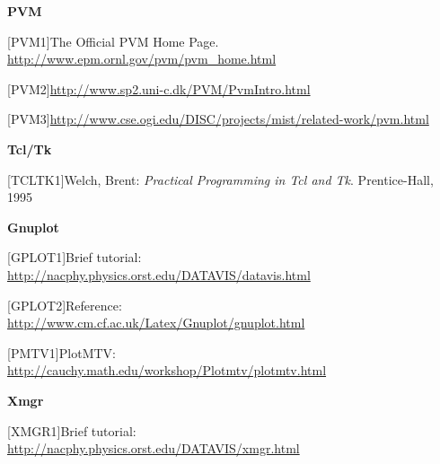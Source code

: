 \textbf{PVM}

[PVM1]\tab The Official PVM Home Page. \href{http://www.epm.ornl.gov/pvm/pvm\_home.html}{http://www.epm.ornl.gov/pvm/pvm\_home.html}

[PVM2]\tab \href{http://www.sp2.uni-c.dk/PVM/PvmIntro.html}{http://www.sp2.uni-c.dk/PVM/PvmIntro.html}

[PVM3]\tab \href{http://www.cse.ogi.edu/DISC/projects/mist/related-work/pvm.html}{http://www.cse.ogi.edu/DISC/projects/mist/related-work/pvm.html}



\textbf{Tcl/Tk}

[TCLTK1]\tab Welch, Brent: \textit{Practical Programming in Tcl and Tk}. Prentice-Hall, 1995



\textbf{Gnuplot}


[GPLOT1]\tab Brief tutorial:\\
\href{http://nacphy.physics.orst.edu/DATAVIS/datavis.html}{http://nacphy.physics.orst.edu/DATAVIS/datavis.html}


[GPLOT2]\tab Reference:\\
\href{http://www.cm.cf.ac.uk/Latex/Gnuplot/gnuplot.html}{http://www.cm.cf.ac.uk/Latex/Gnuplot/gnuplot.html}


[PMTV1]\tab PlotMTV:\\
\href{http://cauchy.math.edu/workshop/Plotmtv/plotmtv.html}{http://cauchy.math.edu/workshop/Plotmtv/plotmtv.html}


\textbf{Xmgr}

[XMGR1]\tab Brief tutorial:\\
\href{http://nacphy.physics.orst.edu/DATAVIS/xmgr.html}{http://nacphy.physics.orst.edu/DATAVIS/xmgr.html}


